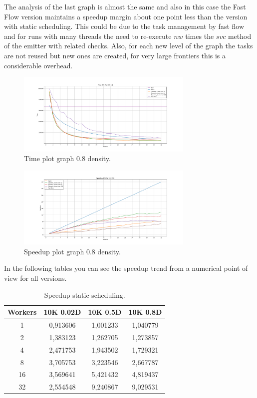 The analysis of the last graph is almost the same and also in this case the Fast Flow version maintains a speedup margin about one point less than the version with static scheduling. This could be due to the task management by fast flow and for runs with many threads the need to re-execute $nw$ times the $svc$ method of the emitter with related checks. Also, for each new level of the graph the tasks are not reused but new ones are created, for very large frontiers this is a considerable overhead.

\begin{figure}[htb!]
    \centering
    \includegraphics[width=0.75\textwidth]{Figures/plot_map_time_vs10K08.png}
    \caption{Time plot graph 0.8 density.}
    \label{fig:plot_time_10k_08}
\end{figure}
\FloatBarrier

\begin{figure}[htb!]
    \centering
    \includegraphics[width=0.75\textwidth]{Figures/plot_map_speedup_vs10K08.png}
    \caption{Speedup plot graph 0.8 density.}
    \label{fig:plot_speedup_10k_08}
\end{figure}
\FloatBarrier

In the following tables you can see the speedup trend from a numerical point of view for all versions.
\begin{table}[htb!]
\centering
\begin{tabular}{|c|c|c|c|}
\hline
Workers & 10K 0.02D & 10K 0.5D & 10K 0.8D \\ \hline
1       & 0,913606  & 1,001233 & 1,040779 \\ \hline
2       & 1,383123  & 1,262705 & 1,273857 \\ \hline
4       & 2,471753  & 1,943502 & 1,729321 \\ \hline
8       & 3,705753  & 3,223546 & 2,667787 \\ \hline
16      & 3,569641  & 5,421432 & 4,819437 \\ \hline
32      & 2,554548  & 9,240867 & 9,029531 \\ \hline
\end{tabular}
\caption{Speedup static scheduling.}
\label{table:spup_static}
\end{table}
\FloatBarrier

